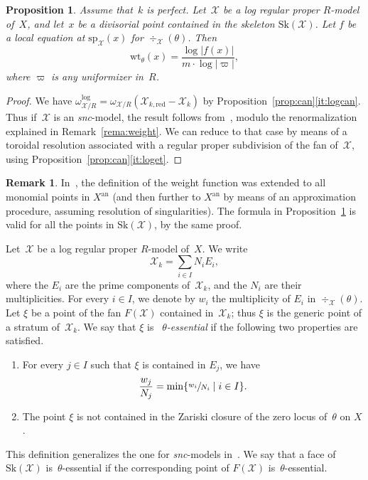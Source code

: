 \documentclass[11pt]{article}
\newtheorem{prop}[equation]{Proposition}
\theoremstyle{definition}
\newtheorem{remark}[equation]{Remark}
\numberwithin{equation}{subsection}
\newcommand{\cX}{\ensuremath{\mathscr{X}}}
\newcommand{\snc}{\textit{snc}}
\newcommand{\an}{\mathrm{an}}
\newcommand{\red}{\mathrm{red}}
\newcommand{\Sk}{\mathrm{Sk}}
\newcommand{\spe}{\mathrm{sp}}
\newcommand{\wt}{\mathrm{wt}}
\let\form\theta
\let\unif\varpi
\begin{document}
\begin{prop}\label{prop:logweight} Assume that~$k$ is perfect.
Let~$\cX$ be a log regular proper $R$\nobreakdash-model of~$X$, and let~$x$ be a divisorial point contained in the skeleton $\Sk(\cX)$.
Let $f$ be a local equation at $\spe_{\cX}(x)$ for $\div_{\cX}(\form)$. Then
\[
\wt_{\form}(x)=\frac{\log |f(x)|}{m\cdot \log |\unif|},
\]
where $\unif$ is any uniformizer in~$R$.
\end{prop}
\begin{proof} We have $\omega^{\log}_{\cX/R}=\omega_{\cX/R}(\cX_{k,\red}-\cX_k)$ by Proposition~\ref{prop:can}\eqref{it:logcan}.
Thus if~$\cX$ is an \snc-model, the result follows from~\cite[4.3.7]{MuNi}, modulo the renormalization explained in Remark~\ref{rema:weight}.
We can reduce to that case by means of a toroidal resolution associated with a regular proper subdivision of the fan of~$\cX$, using Proposition~\ref{prop:can}\eqref{it:loget}.
\end{proof}

\begin{remark}
In~\cite{MuNi}, the definition of the weight function was extended to all monomial points in $X^{\an}$ (and then further to $X^{\an}$ by means of an approximation procedure, assuming resolution of singularities). The formula in Proposition~\ref{prop:logweight} is valid for all the points in $\Sk(\cX)$, by the same proof.
\end{remark}

Let~$\cX$ be a log regular proper $R$\nobreakdash-model of~$X$. We write
\[
\cX_k=\sum_{i\in I}N_iE_i,
\]
where the $E_i$ are the prime components of~$\cX_k$, and the $N_i$ are their multiplicities. For every $i\in I$, we denote by $w_i$ the multiplicity of $E_i$ in $\div_{\cX}(\form)$.
Let $\xi$ be a point of the fan $F(\cX)$ contained in~$\cX_k$; thus $\xi$ is the generic point of a stratum of~$\cX_k$.
We say that $\xi$ is {\em~$\form$-essential} if the following two properties are satisfied.
\begin{enumerate}
\item For every $j\in I$ such that $\xi$ is contained in $E_j$, we have
\[
\frac{w_j}{N_j}=\min\{\sfrac{w_i}{N_i}\mid i\in I\}.
\]
\item The point $\xi$ is not contained in the Zariski closure of the zero locus of~$\form$ on $X$.
\end{enumerate}
This definition generalizes the one for \snc-models in~\cite[4.7.4]{MuNi}. We say that a face of $\Sk(\cX)$ is~$\form$-essential if the corresponding point of $F(\cX)$ is~$\form$-essential.
\end{document}
